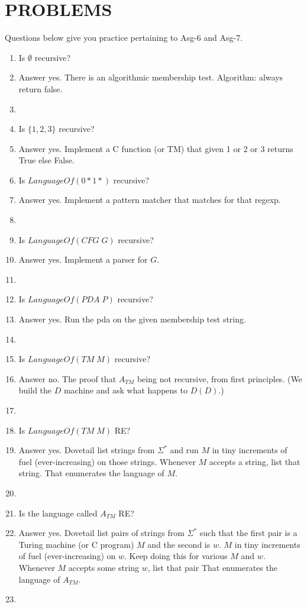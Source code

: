 \documentclass[10pt]{article}
\begin{document}
\section{PROBLEMS}

\noindent Questions below give you practice pertaining to Asg-6 and Asg-7.

\begin{enumerate}
\item Is $\emptyset$ recursive?
\item[] {\sf Answer yes. There is an algorithmic membership test. Algorithm: always return false.}
\item[]
  
\item Is $\{1,2,3\}$ recursive?
\item[] {\sf Answer yes. Implement a C function (or TM) that given 1 or 2 or 3 returns True else False.}

\item Is $LanguageOf(0*1*)$ recursive?
\item[] {\sf Answer yes. Implement a pattern matcher that matches for that regexp.}
\item[]

\item Is $LanguageOf(CFG\; G)$ recursive?
\item[] {\sf Answer yes. Implement a parser for $G$.}
\item[]

\item Is $LanguageOf(PDA\; P)$ recursive?
\item[] {\sf Answer yes. Run the pda on the given membership test string.}
\item[]  

\item Is $LanguageOf(TM\; M)$ recursive?
\item[] {\sf Answer no.} The proof that $A_{TM}$ being not recursive, from first principles. (We build the $D$ machine
   and ask what happens to $D(D)$.)
\item[]  

\item Is $LanguageOf(TM\; M)$ RE?
\item[] {\sf Answer yes.} Dovetail list strings from
  $\Sigma^*$ and run $M$ in tiny increments of fuel (ever-increasing) on those strings. Whenever
  $M$ accepts a string, list that string. That enumerates the language of $M$.
\item[]

\item Is the language called $A_{TM}$ RE?
\item[] {\sf Answer yes.} Dovetail list pairs of strings from $\Sigma^*$
  such that the first pair is a Turing machine (or C program) $M$ and the second is $w$.
  $M$ in tiny increments of fuel (ever-increasing) on $w$. Keep doing this for various $M$ and $w$.
  Whenever
  $M$ accepts some string $w$, list that pair That enumerates the language of $A_{TM}$.
\item[]    
\end{enumerate}
\end{document}

